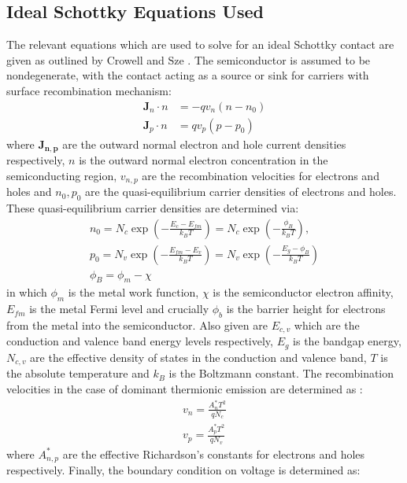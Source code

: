 \begin{refsection}
\subsection{Ideal Schottky Equations Used}
The relevant equations which are used to solve for an ideal Schottky contact are given as outlined by Crowell \cite{crowell:1966} and Sze \cite{sze2006}. The semiconductor is assumed to be nondegenerate, with the contact acting as a source or sink for carriers with surface recombination mechanism:
\begin{align}
    \bm{J}_{n} \cdot n &= -q v_{n} (n - n_{0}) \\
    \bm{J}_{p} \cdot n &= q v_{p} (p - p_{0})
\end{align}
\noindent where $\bm{J_{n,p}}$ are the outward normal electron and hole current densities respectively, $n$ is the outward normal electron concentration in the semiconducting region, $v_{n,p}$ are the recombination velocities for electrons and holes and $n_{0}, p_{0}$ are the quasi-equilibrium carrier densities of electrons and holes. These quasi-equilibrium carrier densities are determined via:
\begin{align}
    n_0 = N_{c} \exp \left( -\frac{E_{c} - E_{fm}}{k_{B} T} \right) = N_{c} \exp \left( -\frac{\phi_{B}}{k_{B} T} \right), \\
    p_0 = N_{v} \exp \left( -\frac{E_{fm} - E_{v}}{k_{B} T} \right) = N_{v} \exp \left( -\frac{E_{g} - \phi_B}{k_{B} T} \right)\\
    \phi_{B} = \phi_{m}-\chi
\end{align}
\noindent in which $\phi_{m}$ is the metal work function, $\chi$ is the semiconductor electron affinity, $E_{fm}$ is the metal Fermi level and crucially $\phi_{b}$ is the barrier height for electrons from the metal into the semiconductor. Also given are $E_{c,v}$ which are the conduction and valence band energy levels respectively, $E_{g}$ is the bandgap energy, $N_{c,v}$ are the effective density of states in the conduction and valence band, $T$ is the absolute temperature and $k_{B}$ is the Boltzmann constant. The recombination velocities in the case of dominant thermionic emission are determined as \cite{Shur1990}:
\begin{align}
    v_{n} = \frac{A^{*}_{n} T^2}{q N_{c}} \\
    v_{p} = \frac{A^{*}_{p} T^2}{q N_{v}}
\end{align}
\noindent where $A^{*}_{n,p}$ are the effective Richardson's constants for electrons and holes respectively. Finally, the boundary condition on voltage is determined as:


\end{refsection}
